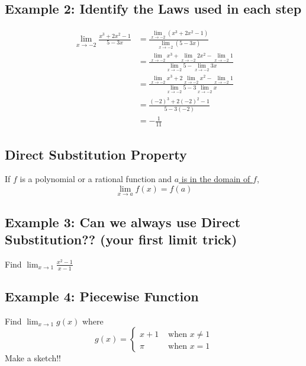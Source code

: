 \documentclass[10pt]{book}
\theoremstyle{definition}
\begin{document}
\subsection*{Example 2: Identify the Laws used in each step}
\begin{align*}
    \lim_{x\rightarrow -2}\frac{x^3+2x^2-1}{5-3x}&=\frac{\displaystyle\lim_{x\rightarrow -2}\left(x^3+2x^2-1\right)}{\displaystyle\lim_{x\rightarrow -2}\left(5-3x\right)}\\[8pt]
    &=\frac{\displaystyle\lim_{x\rightarrow -2}x^3+\lim_{x\rightarrow -2}2x^2-\lim_{x\rightarrow -2}1}{\displaystyle\lim_{x\rightarrow -2}5-\lim_{x\rightarrow -2}3x}
    \\[8pt]
    &=\frac{\displaystyle\lim_{x\rightarrow -2}x^3+2\lim_{x\rightarrow -2}x^2-\lim_{x\rightarrow -2}1}{\displaystyle\lim_{x\rightarrow -2}5-3\lim_{x\rightarrow -2}x}
    \\[8pt]
    &=\frac{(-2)^3+2(-2)^2-1}{5-3(-2)}\\[8pt]
    &=-\frac{1}{11}
\end{align*}
\begin{tcolorbox}
\subsection*{Direct Substitution Property}
If $f$ is a polynomial or a rational function and \underline{$a$ is in the domain of $f$},
\[
\lim_{x\rightarrow a}f(x)=f(a)
\]
\end{tcolorbox}
\subsection*{Example 3: Can we always use Direct Substitution?? (your first limit trick)}
Find $\displaystyle\lim_{x\rightarrow 1}\frac{x^2-1}{x-1}$
\clearpage
\subsection*{Example 4: Piecewise Function} 
Find $\displaystyle\lim_{x\rightarrow 1}g(x)$ where
\[
g(x)=\begin{cases}
x+1 & \textrm{ when }x\neq 1\\
\pi & \textrm{ when }x = 1
\end{cases}
\]
Make a sketch!!
\\ \\ \\ \\ \\ \\ \\ \\ \\ \\ 
\end{document}
